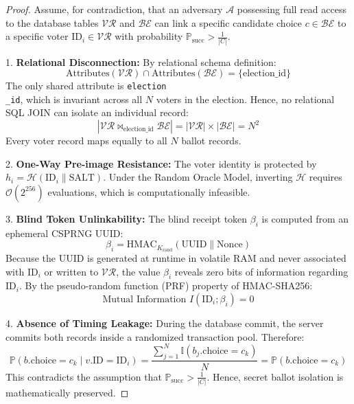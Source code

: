 \documentclass[12pt,a4paper,oneside]{report}
\begin{document}
\begin{proof}
Assume, for contradiction, that an adversary $\mathcal{A}$ possessing full read access to the database tables $\mathcal{VR}$ and $\mathcal{BE}$ can link a specific candidate choice $c \in \mathcal{BE}$ to a specific voter $\text{ID}_i \in \mathcal{VR}$ with probability $\mathbb{P}_{\text{succ}} > \frac{1}{|C|}$.

1. \textbf{Relational Disconnection:} By relational schema definition:
\begin{equation}
    \text{Attributes}(\mathcal{VR}) \cap \text{Attributes}(\mathcal{BE}) = \{ \text{election\_id} \}
\end{equation}
The only shared attribute is \texttt{election\\_id}, which is invariant across all $N$ voters in the election. Hence, no relational SQL JOIN can isolate an individual record:
\begin{equation}
    |\mathcal{VR} \bowtie_{\text{election\_id}} \mathcal{BE}| = |\mathcal{VR}| \times |\mathcal{BE}| = N^2
\end{equation}
Every voter record maps equally to all $N$ ballot records.

2. \textbf{One-Way Pre-image Resistance:} The voter identity is protected by $h_i = \mathcal{H}(\text{ID}_i \parallel \text{SALT})$. Under the Random Oracle Model, inverting $\mathcal{H}$ requires $\mathcal{O}(2^{256})$ evaluations, which is computationally infeasible.

3. \textbf{Blind Token Unlinkability:} The blind receipt token $\beta_i$ is computed from an ephemeral CSPRNG UUID:
\begin{equation}
    \beta_i = \text{HMAC}_{K_{\text{rand}}}(\text{UUID} \parallel \text{Nonce})
\end{equation}
Because the UUID is generated at runtime in volatile RAM and never associated with $\text{ID}_i$ or written to $\mathcal{VR}$, the value $\beta_i$ reveals zero bits of information regarding $\text{ID}_i$. By the pseudo-random function (PRF) property of HMAC-SHA256:
\begin{equation}
    \text{Mutual Information } I(\text{ID}_i ; \beta_i) = 0
\end{equation}

4. \textbf{Absence of Timing Leakage:} During the database commit, the server commits both records inside a randomized transaction pool. Therefore:
\begin{equation}
    \mathbb{P}(b.\text{choice} = c_k \mid v.\text{ID} = \text{ID}_i) = \frac{\sum_{j=1}^N \mathbb{I}(b_j.\text{choice} = c_k)}{N} = \mathbb{P}(b.\text{choice} = c_k)
\end{equation}
This contradicts the assumption that $\mathbb{P}_{\text{succ}} > \frac{1}{|C|}$. Hence, secret ballot isolation is mathematically preserved.
\end{proof}
\end{document}

